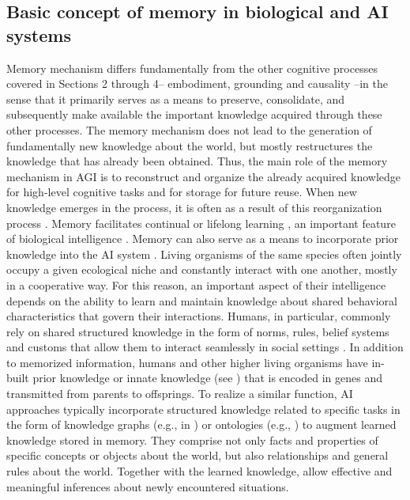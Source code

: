 \documentclass[10pt,journal,compsoc]{IEEEtran}
\begin{document}
	\subsection{Basic concept of memory in biological and AI systems }
	Memory mechanism differs fundamentally from the other cognitive processes covered in Sections 2 through 4– embodiment, grounding and causality –in the sense that it primarily serves as a means to preserve, consolidate, and subsequently make available the important knowledge acquired through these other processes. The memory mechanism does not lead to the generation of fundamentally new knowledge about the world, but mostly restructures the knowledge that has already been obtained. Thus, the main role of the memory mechanism in AGI is to reconstruct and organize the already acquired knowledge for high-level cognitive tasks and for storage for future reuse. When new knowledge emerges in the process, it is often as a result of this reorganization process \cite{versace2014act}. Memory facilitates continual \cite{lavin2021simulation,guo2020improved} or lifelong learning \cite{bang2021rainbow}, an important feature of biological intelligence \cite{kudithipudi2022biological}. Memory can also serve as a means to incorporate prior knowledge into the AI system \cite{zhang2024memsim,anokhin2024arigraph}. 
	Living organisms of the same species often jointly occupy a given ecological niche and constantly interact with one another, mostly in a cooperative way. For this reason, an important aspect of their intelligence depends on the ability to learn and maintain knowledge about shared behavioral characteristics that govern their interactions. Humans, in particular, commonly rely on shared structured knowledge in the form of norms, rules, belief systems and customs that allow them to interact seamlessly in social settings \cite{adams2012beyond}. In addition to memorized information, humans and other higher living organisms have in-built prior knowledge or innate knowledge (see 
	\cite{taatgen2017cognitive,griffiths2009distinction}) that is encoded in genes and transmitted from parents to offsprings. To realize a similar function, AI approaches typically incorporate structured knowledge related to specific tasks in the form of knowledge graphs (e.g., in \cite{feng2023knowledge,li2024kgmistral}) or ontologies (e.g., \cite{bendiken2024know,allemang2024increasing}) to augment learned knowledge stored in memory. They comprise not only facts and properties of specific concepts or objects about the world, but also relationships and general rules about the world. Together with the learned knowledge, allow effective and meaningful inferences about newly encountered situations. 
	
\end{document}
